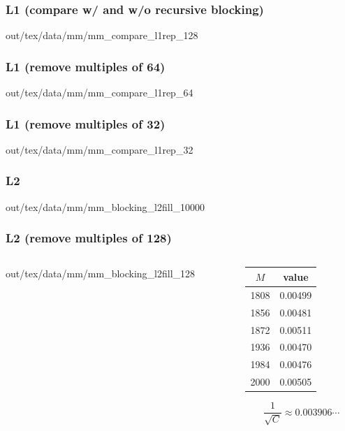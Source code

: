 \documentclass[12pt,dvipdfmx]{beamer}
\begin{document}
\begin{frame}
\frametitle{L1 (compare w/ and w/o recursive blocking)}
\begin{center}
\def\svgwidth{0.8\textwidth}  
out/tex/data/mm/mm\_compare\_l1rep\_128
\end{center}
\end{frame}

\begin{frame}
\frametitle{L1 (remove multiples of 64)}
\begin{center}
\def\svgwidth{0.8\textwidth}  
out/tex/data/mm/mm\_compare\_l1rep\_64
\end{center}
\end{frame}

\begin{frame}
\frametitle{L1 (remove multiples of 32)}
\begin{center}
\def\svgwidth{0.8\textwidth}  
out/tex/data/mm/mm\_compare\_l1rep\_32
\end{center}
\end{frame}

\begin{frame}
\frametitle{L2}
\begin{center}
\def\svgwidth{0.8\textwidth}  
out/tex/data/mm/mm\_blocking\_l2fill\_10000
\end{center}
\end{frame}

\begin{frame}
\frametitle{L2 (remove multiples of 128)}
\begin{columns}
  \begin{column}{0.7\textwidth}
\begin{center}
\def\svgwidth{0.8\textwidth}  
out/tex/data/mm/mm\_blocking\_l2fill\_128
\end{center}
  \end{column}
  \begin{column}{0.3\textwidth}
    \begin{tabular}{|c|c|}\hline
 $M$  & value  \\\hline
 1808 & 0.00499 \\
 1856 & 0.00481 \\
 1872 & 0.00511 \\
 1936 & 0.00470 \\
 1984 & 0.00476 \\
 2000 & 0.00505 \\\hline
    \end{tabular}
\[ \frac{1}{\sqrt{C}} \approx 0.003906\cdots \]
  \end{column}  
\end{columns}

\end{frame}
\end{document}
